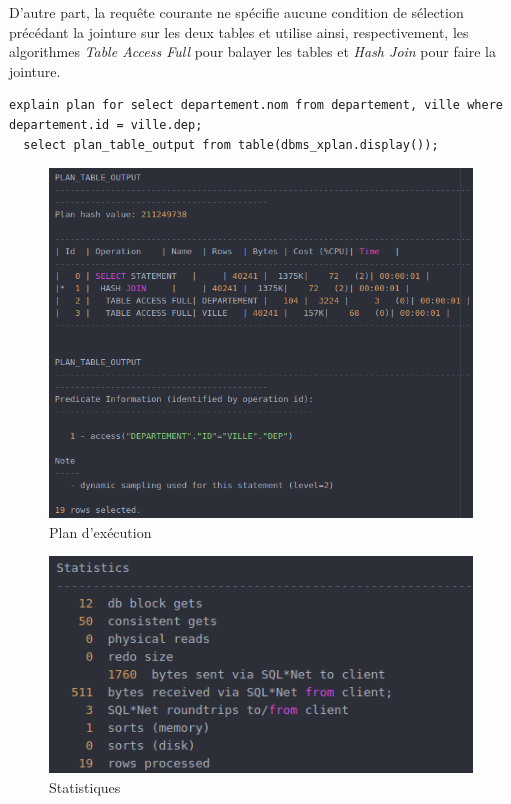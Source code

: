 \documentclass[a4paper,12pt]{article}
\begin{document}
D'autre part, la requête courante ne spécifie aucune condition de sélection précédant la jointure sur les deux tables et utilise ainsi, respectivement, les algorithmes \textit{Table Access Full} pour balayer les tables et \textit{Hash Join} pour faire la jointure.

\begin{lstlisting}[caption={plan d'exécution choisi par l'optimiseur pour la requête permettant d'afficher le nom du département pour toutes les villes}]
  explain plan for select departement.nom from departement, ville where departement.id = ville.dep;
  select plan_table_output from table(dbms_xplan.display());
\end{lstlisting}

\begin{figure}[!ht]
  \centering
  \includegraphics[scale=0.6]{images/q6_1.png}
  \caption{Plan d'exécution}
\end{figure}

\begin{figure}[!ht]
  \centering
  \includegraphics[scale=0.6]{images/q6_2.png}
  \caption{Statistiques}
\end{figure}
\end{document}
